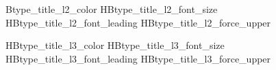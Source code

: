 
\providecommand{\HBifupper}[2]{%
  \ifnum#1=1\relax\MakeUppercase{#2}\else#2\fi
}


\providecommand{\HBTypeBaseStart}{%
  \HBFontRegular
  \color{\csname HBtype_body_color\endcsname}%
  \fontsize{\csname HBtype_body_font_size\endcsname}{\csname HBtype_body_font_leading\endcsname}\selectfont
}

\providecommand{\HBTypeHOne}[1]{%
  {\color{white}\HBFontBold
   \fontsize{\csname HBtype_h1_font_size\endcsname}{\csname HBtype_h1_font_leading\endcsname}\selectfont
   \HBifupper{\csname HBtype_h1_force_upper\endcsname}{#1}}%
}

\providecommand{\HBTypeTitleLevelOne}[1]{%
  \HBTypeHOne{#1}%
}

\expandafter\providecommand\csname HBtype_title_l2_color
\expandafter\providecommand\csname HBtype_title_l2_font_size\endcsname{8.6pt}
\expandafter\providecommand\csname HBtype_title_l2_font_leading\endcsname{9.4pt}
\expandafter\providecommand\csname HBtype_title_l2_force_upper
\providecommand{\HBTypeTitleLevelTwo}[1]{%
  {\HBFontHeavy
   \color{\csname HBtype_title_l2_color\endcsname}%
   \fontsize{\csname HBtype_title_l2_font_size\endcsname}
            {\csname HBtype_title_l2_font_leading\endcsname}\selectfont
   \RaggedRight
   \HBifupper{\csname HBtype_title_l2_force_upper\endcsname}{#1}}%
}

\expandafter\providecommand\csname HBtype_title_l3_color
\expandafter\providecommand\csname HBtype_title_l3_font_size\endcsname{7.0pt}
\expandafter\providecommand\csname HBtype_title_l3_font_leading\endcsname{8.0pt}
\expandafter\providecommand\csname HBtype_title_l3_force_upper
\providecommand{\HBTypeTitleLevelThree}[1]{%
  {\HBFontSemiBold
   \color{\csname HBtype_title_l3_color\endcsname}%
   \fontsize{\csname HBtype_title_l3_font_size\endcsname}
            {\csname HBtype_title_l3_font_leading\endcsname}\selectfont
   \RaggedRight
   \HBifupper{\csname HBtype_title_l3_force_upper\endcsname}{#1}}%
}

